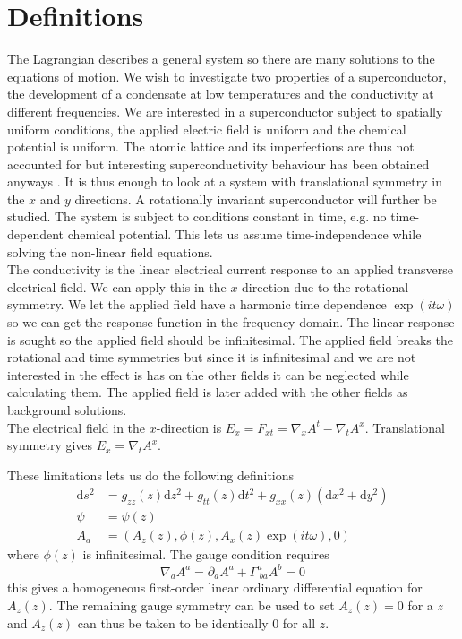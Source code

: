 \documentclass[12pt]{report}
\renewcommand{\d}{\ensuremath{\mathrm{d}}}
\renewcommand{\i}{\ensuremath{i}}
\newcommand{\At}{\ensuremath{{\phi}}}
\begin{document}
\section{Definitions}
The Lagrangian describes a general system so there are many solutions to the equations of motion. We wish to investigate two properties of a superconductor, the development of a condensate at low temperatures and the conductivity at different frequencies. We are interested in a superconductor subject to spatially uniform conditions, the applied electric field is uniform and the chemical potential is uniform. The atomic lattice and its imperfections are thus not accounted for but interesting superconductivity behaviour has been obtained anyways \cite{hartnoll9}. It is thus enough to look at a system with translational symmetry in the $x$ and $y$ directions. A rotationally invariant superconductor will further be studied. The system is subject to conditions constant in time, e.g. no time-dependent chemical potential. This lets us assume time-independence while solving the non-linear field equations.\\

The conductivity is the linear electrical current response to an applied transverse electrical field. We can apply this in the $x$ direction due to the rotational symmetry. We let the applied field have a harmonic time dependence $\exp(\i t \omega)$ so we can get the response function in the frequency domain. The linear response is sought so the applied field should be infinitesimal. The applied field breaks the rotational and time symmetries but since it is infinitesimal and we are not interested in the effect is has on the other fields it can be neglected while calculating them. The applied field is later added with the other fields as background solutions.\\
The electrical field in the $x$-direction is $E_x=F_{xt}=\nabla_xA^t-\nabla_tA^x$. Translational symmetry gives $E_x=\nabla_tA^x$.

These limitations lets us do the following definitions
\begin{equation}
 \begin{split}
  \d s^2&=g_{zz}(z)\d z^2+g_{tt}(z)\d t^2+g_{xx}(z)(\d x^2+\d y^2)  \\
  \psi&=\psi(z)\\
  A_a&=(A_z(z), \At(z), A_x(z)\exp(\i t \omega), 0)
 \end{split}\label{defs}
\end{equation}
where $\At(z)$ is infinitesimal.
The gauge condition requires
\begin{equation}
 \nabla_aA^a=\partial_aA^a+\Gamma^a_{\ ba}A^b=0
\end{equation}
this gives a homogeneous first-order linear ordinary differential equation for $A_z(z)$. The remaining gauge symmetry can be used to set $A_z(z)=0$ for a $z$ and $A_z(z)$ can thus be taken to be identically 0 for all $z$.\\
\end{document}
